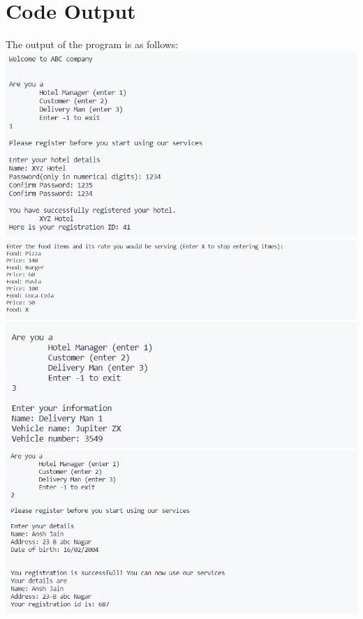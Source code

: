 \documentclass[12pt]{article}
\begin{document}
\section{Code Output}
The output of the program is as follows:\\
\includegraphics{out_1.png}\\
\includegraphics{out_2.png}\\
\includegraphics{out_3.png}\\
\includegraphics{out_4.png}\\
\end{document}
